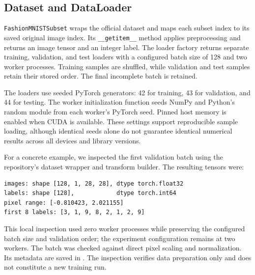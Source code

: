 \subsection{Dataset and DataLoader}

\texttt{FashionMNISTSubset} wraps the official dataset and maps each subset index to its saved original image index. Its \texttt{\_\_getitem\_\_} method applies preprocessing and returns an image tensor and an integer label. The loader factory returns separate training, validation, and test loaders with a configured batch size of 128 and two worker processes. Training samples are shuffled, while validation and test samples retain their stored order. The final incomplete batch is retained.

The loaders use seeded PyTorch generators: 42 for training, 43 for validation, and 44 for testing. The worker initialization function seeds NumPy and Python's random module from each worker's PyTorch seed. Pinned host memory is enabled when CUDA is available. These settings support reproducible sample loading, although identical seeds alone do not guarantee identical numerical results across all devices and library versions.

For a concrete example, we inspected the first validation batch using the repository's dataset wrapper and transform builder. The resulting tensors were:
\begin{verbatim}
images: shape [128, 1, 28, 28], dtype torch.float32
labels: shape [128],            dtype torch.int64
pixel range: [-0.810423, 2.021155]
first 8 labels: [3, 1, 9, 8, 2, 1, 2, 9]
\end{verbatim}

This local inspection used zero worker processes while preserving the configured batch size and validation order; the experiment configuration remains at two workers. The batch was checked against direct pixel scaling and normalization. Its metadata are saved in . The inspection verifies data preparation only and does not constitute a new training run.
